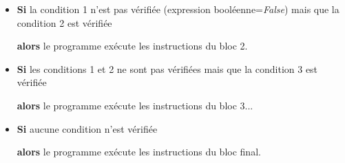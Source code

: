 \begin{center}
{\begin{minipage}{15cm}
\begin{itemize}
\textbf{alors} le programme exécute les instructions du bloc 1.

\item \textbf{Si} la condition 1 n'est pas vérifiée (expression booléenne=\textit{False}) mais que 
la condition 2 est vérifiée

\textbf{alors} le programme exécute les instructions du bloc 2.

\item \textbf{Si} les conditions 1 et 2 ne sont pas vérifiées  mais que la condition 3 est vérifiée

\textbf{alors} le programme exécute les instructions du bloc 3...

\item \textbf{Si} aucune condition n'est vérifiée

\textbf{alors} le programme exécute les instructions du bloc final.
\end{itemize}
\end{minipage}}

\end{center}

